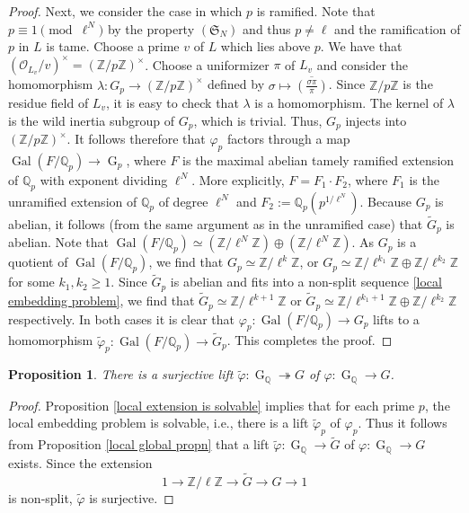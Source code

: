 \documentclass[11pt,reqno]{amsart}
\newtheorem{proposition}[theorem]{Proposition}
\newcommand{\Z}{\mathbb{Z}}
\newcommand{\Q}{\mathbb{Q}}
\newcommand{\cO}{\mathcal{O}}
\newcommand{\op}[1]{\operatorname{#1}}
\numberwithin{equation}{section}
\begin{document}
\begin{proof}
\par Next, we consider the case in which $p$ is ramified. Note that $p\equiv 1\pmod{\ell^N}$ by the property $(\mathfrak{S}_N)$ and thus $p\neq \ell$ and the ramification of $p$ in $L$ is tame. Choose a prime $v$ of $L$ which lies above $p$. We have that \( (\cO_{L_{v}} / v)^\times = (\mathbb{Z} / p \mathbb{Z})^\times \). Choose a uniformizer $\pi$ of $L_v$ and consider the homomorphism $\lambda: G_p \to (\mathbb{Z} / p \mathbb{Z})^\times$ defined
by $\sigma \mapsto \overline{\left(\frac{\sigma \pi}{\pi}\right)}$. Since $\Z/p\Z$ is the residue field of $L_v$, it is easy to check that $\lambda$ is a homomorphism. The kernel of $\lambda$ is the wild inertia subgroup of $G_p$, which is trivial. Thus, \( G_p \) injects into \( (\mathbb{Z} / p \mathbb{Z})^\times \). It follows therefore that \( \varphi_p \) factors through a map $\op{Gal}(F/\Q_p)\rightarrow \op{G}_p$, where \( F \) is the maximal abelian tamely ramified extension of \( \mathbb{Q}_p \) with exponent dividing \( \ell^N \). More explicitly, \( F =F_1\cdot F_2\), where $F_1$ is the unramified extension of $\Q_p$ of degree $\ell^N$ and $F_2:=\mathbb{Q}_p(p^{1/\ell^N})$. Because $G_p$ is abelian, it follows (from the same argument as in the unramified case) that $\widetilde{G}_p$ is abelian. Note that \( \operatorname{Gal}(F / \mathbb{Q}_p) \simeq  (\mathbb{Z} / \ell^N \mathbb{Z}) \oplus (\mathbb{Z} / \ell^N \mathbb{Z})\). As $G_p$ is a quotient of $\op{Gal}(F/\Q_p)$, we find that $G_p\simeq \Z/\ell^k \Z$, or $G_p\simeq \Z/\ell^{k_1} \Z\oplus \Z/\ell^{k_2} \Z$ for some $k_1, k_2\geq 1$. Since $\widetilde{G}_p$ is abelian and fits into a non-split sequence \eqref{local embedding problem}, we find that $\widetilde{G}_p\simeq \Z/\ell^{k+1}\Z$ or $\widetilde{G}_p\simeq \Z/\ell^{k_1+1}\Z\oplus \Z/\ell^{k_2}\Z$ respectively. In both cases it is clear that $\varphi_p:\op{Gal}(F/\Q_p)\rightarrow G_p$ lifts to a homomorphism $\widetilde{\varphi}_p:\op{Gal}(F/\Q_p)\rightarrow \widetilde{G}_p$. This completes the proof.
\end{proof}

\begin{proposition}\label{global embedding problem}
    There is a surjective lift $\widetilde{\varphi}: \op{G}_\Q\twoheadrightarrow G$ of $\varphi:\op{G}_{\Q}\rightarrow G$.
\end{proposition}
\begin{proof}
    Proposition \ref{local extension is solvable} implies that for each prime $p$, the local embedding problem is solvable, i.e., there is a lift $\widetilde{\varphi}_p$ of $\varphi_p$. Thus it follows from Proposition \ref{local global propn} that a lift $\widetilde{\varphi}:\op{G}_\Q\rightarrow \widetilde{G}$ of $\varphi: \op{G}_\Q\rightarrow G$ exists. Since the extension 
    \[1\rightarrow \Z/\ell\Z\rightarrow \widetilde{G}\rightarrow G\rightarrow 1\] is non-split, $\widetilde{\varphi}$ is surjective.
\end{proof}
\end{document}
